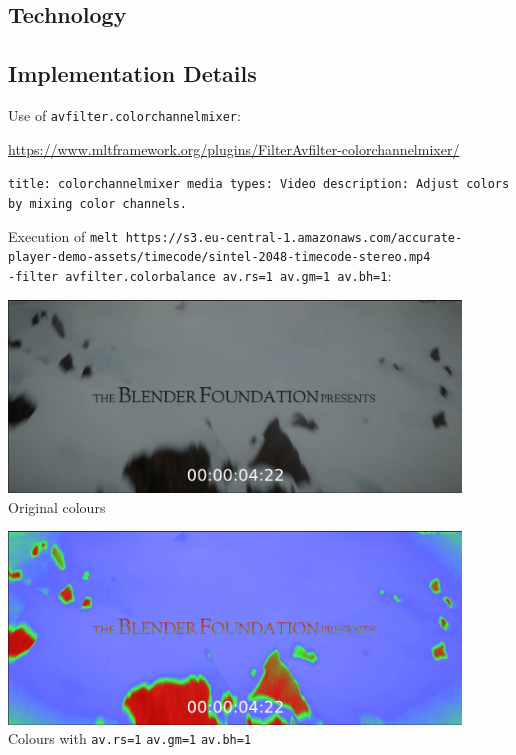 \documentclass[12pt,a4paper]{article}
\begin{document}
\subsection{Technology} \label{subsection:technology}







\subsection{Implementation Details} \label{subsection:implementationdetails}


Use of \texttt{avfilter.colorchannelmixer}:

\url{https://www.mltframework.org/plugins/FilterAvfilter-colorchannelmixer/}

\texttt{title: colorchannelmixer \newline
	media types: Video \newline
	description: Adjust colors by mixing color channels.}

Execution of \texttt{melt https://s3.eu-central-1.amazonaws.com/accurate-player\--demo-assets/timecode/sintel-2048-timecode-stereo.mp4 \\ -filter avfilter.colorbalance av.rs=1 av.gm=1 av.bh=1}:


\begin{minipage}{0.5\textwidth}
	\includegraphics[width=0.9\textwidth]{colourdefault.png}
	Original colours
\end{minipage}\begin{minipage}{0.5\textwidth}
	\includegraphics[width=0.9\textwidth]{colourhigh.png}
	Colours with \texttt{av.rs=1} \texttt{av.gm=1} \texttt{av.bh=1}
\end{minipage}
\end{document}
